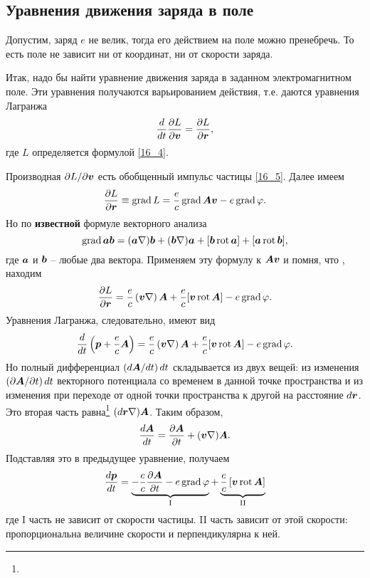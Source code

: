\subsection{Уравнения движения заряда в поле}




Допустим, заряд $e$ не велик, тогда его действием на поле можно пренебречь. То есть поле не зависит ни от координат, ни от скорости заряда.

Итак, надо бы найти уравнение движения заряда в заданном электромагнитном поле. Эти уравнения получаются варьированием действия, т.е. даются уравнения Лагранжа
\begin{equation}
    \frac{d}{dt} \frac{\partial L}{\partial \mbox{\boldmath $v$}} = \frac{\partial L}{\partial \mbox{\boldmath $r$}},
\end{equation}
где $L$ определяется формулой \eqref{16_4}.

Производная ${\partial L} / {\partial \mbox{\boldmath $v$}}$ есть обобщенный импульс частицы \eqref{16_5}. Далее имеем 
\begin{equation}
    \frac{\partial L}{\partial \mbox{\boldmath $r$}} \equiv \mathop{\mathrm{grad}}\nolimits L = \frac{e}{c} \mathop{\mathrm{grad}}\nolimits \mbox{\boldmath $A$} \mbox{\boldmath $v$} - e \mathop{\mathrm{grad}}\nolimits \varphi.
\end{equation}
Но по \textbf{известной} формуле векторного анализа
$$
    \mathop{\mathrm{grad}}\nolimits \mbox{\boldmath $ab$} = (\mbox{\boldmath $a$} \nabla) \mbox{\boldmath $b$} + (\mbox{\boldmath $b$} \nabla) \mbox{\boldmath $a$} + [\mbox{\boldmath $b$} \mathop{\mathrm{rot}}\nolimits \mbox{\boldmath $a$}] + [\mbox{\boldmath $a$} \mathop{\mathrm{rot}}\nolimits \mbox{\boldmath $b$}],
$$
где $\mbox{\boldmath $a$}$ и $\mbox{\boldmath $b$}$ -- любые два вектора. Применяем эту формулу к $\mbox{\boldmath $Av$}$ и помня, что , находим
$$
    \frac{\partial L}{\partial \mbox{\boldmath $r$}} = \frac{e}{c} \left(\mbox{\boldmath $v$} \nabla \right) \mbox{\boldmath $A$} + \frac{e}{c} [\mbox{\boldmath $v$} \mathop{\mathrm{rot}}\nolimits \mbox{\boldmath $A$}] - e \mathop{\mathrm{grad}}\nolimits \varphi.
$$
 Уравнения Лагранжа, следовательно, имеют вид
 $$
     \frac{d}{dt} \left(\mbox{\boldmath $p$} + \frac{e}{c} \mbox{\boldmath $A$}\right) = \frac{e}{c} \left(\mbox{\boldmath $v$} \nabla \right) \mbox{\boldmath $A$} + \frac{e}{c} [\mbox{\boldmath $v$} \mathop{\mathrm{rot}}\nolimits \mbox{\boldmath $A$}] - e \mathop{\mathrm{grad}}\nolimits \varphi.
 $$
Но полный дифференциал $(d \mbox{\boldmath $A$} / d t) \, d t$ складывается из двух вещей:
из изменения $(\partial \mbox{\boldmath $A$} / \partial t) \, d t$ векторного потенциала со временем в данной точке пространства и из изменения при переходе от одной точки пространства к другой на расстояние $d \mbox{\boldmath $r$}$. Это вторая часть равна\footnote{
} $(d \mbox{\boldmath $r$} \nabla) \mbox{\boldmath $A$}$. Таким образом,
$$
    \frac{d \mbox{\boldmath $A$}}{dt} = \frac{\partial \mbox{\boldmath $A$}}{\partial t} + (\mbox{\boldmath $v$} \nabla) \mbox{\boldmath $A$}.
$$
Подставляя это в предыдущее уравнение, получаем
\begin{equation}
\label{17_2}
    \frac{d \mbox{\boldmath $p$}}{dt} = \underbrace{
        - \frac{e}{c} \frac{\partial \mbox{\boldmath $A$}}{\partial t} - e \mathop{\mathrm{grad}}\nolimits \varphi
    }_{\text{I}} +
    \underbrace{
        \frac{e}{c} \left[ \mbox{\boldmath $v$} \mathop{\mathrm{rot}}\nolimits \mbox{\boldmath $A$} \right]
    }_{\text{II}}
\end{equation}
где I часть не зависит от скорости частицы. II часть зависит от этой скорости:
пропорциональна величине скорости и перпендикулярна к ней.

